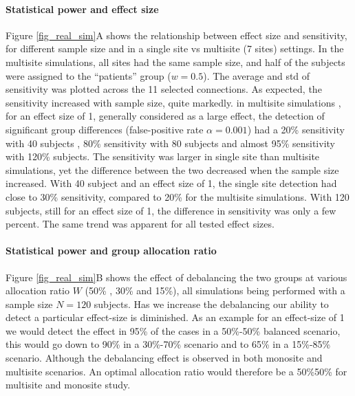 \documentclass[authoryear]{elsarticle}
\begin{document}
\paragraph{Statistical power and effect size} Figure \ref{fig_real_sim}A shows the relationship between effect size and sensitivity, for different sample size and in a single site vs multisite (7 sites) settings. In the multisite simulations, all sites had the same sample size, and half of the subjects were assigned to the ``patients'' group ($w=0.5$). The average and std of sensitivity was plotted across the 11 selected connections. As expected, the sensitivity increased with sample size, quite markedly. in multisite simulations , for an effect size of 1, generally considered as a large effect, the detection of significant group differences (false-positive rate $\alpha=0.001$) had a 20\% sensitivity with 40 subjects , 80\% sensitivity with 80 subjects and almost 95\% sensitivity with 120\% subjects. The sensitivity was larger in single site than multisite simulations, yet the difference between the two decreased when the sample size increased. With 40 subject and an effect size of 1, the single site detection had close to 30\% sensitivity, compared to 20\% for the multisite simulations. With 120 subjects, still for an effect size of 1, the difference in sensitivity was only a few percent. The same trend was apparent for all tested effect sizes. 

\paragraph{Statistical power and group allocation ratio} Figure \ref{fig_real_sim}B shows the effect of debalancing the two groups at various allocation ratio $W$ (50\% , 30\% and 15\%), all simulations being performed with a sample size $N=120$  subjects. Has we increase the debalancing our ability to detect a particular effect-size is diminished. As an example for an effect-size of 1 we would detect the effect in 95\% of the cases in a 50\%-50\% balanced scenario, this would go down to 90\% in a 30\%-70\% scenario and to 65\% in a 15\%-85\% scenario. Although the debalancing effect  is observed in both monosite and multisite scenarios. An optimal allocation ratio would therefore be a 50\%50\% for multisite and monosite study.
\end{document}
